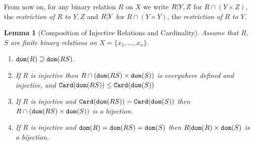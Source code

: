 \documentclass{lmcs}
\newtheorem{lemma}[theorem]{Lemma}
\begin{document}
From now on, for any binary relation $R$ on $X$
we write $R {|} Y,Z$  
for $R \cap (Y \times Z)$, the \emph{restriction of $R$ to $Y,Z$} and 
$R {|} Y$ for $R \cap (Y \times Y)$,
the \emph{restriction of $R$ to $Y$.}

\begin{lemma}[Composition of Injective Relations and Cardinality]
\label{lemma-composition-injective-relations}
Assume that $R$,$S$ are finite binary relations on $X = \{x_1,\ldots,x_n\}$.

\begin{enumerate}
\item
\label{lemma-composition-injective-relations-01}
${\tt dom}(R) \supseteq {\tt dom}(RS)$.

\item
\label{lemma-composition-injective-relations-02}
If $R$ is injective then 
$R \cap ({\tt dom}(RS) \times {\tt dom}(S))$ is everywhere defined and
injective, and ${\tt Card}({\tt dom}(RS)) \le {\tt Card}({\tt dom}(S))$

\item
\label{lemma-composition-injective-relations-03}
If $R$ is injective and ${\tt Card}({\tt dom}(RS)) = {\tt Card}({\tt dom}(S))$
then $R\cap ({\tt dom}(RS) \times {\tt dom}(S))$ is a bijection.

\item
\label{lemma-composition-injective-relations-04}
If $R$ is injective and ${\tt dom}(R)={\tt dom}(RS)={\tt dom}(S)$ 
then $R{|} {\tt dom}(R) \times {\tt dom}(S)$ is a bijection.

\end{enumerate}
\end{lemma}
\end{document}
